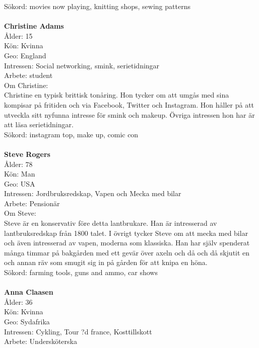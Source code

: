 \documentclass[a4paper,11pt]{article}
\begin{document}
{\begin{thebibliography}{888}
Sökord: movies now playing, knitting shops, sewing patterns \\\\

\textbf{Christine Adams} \\
Ålder: 15 \\
Kön: Kvinna \\
Geo: England \\
Intressen: Social networking, smink, serietidningar \\
Arbete: student \\
Om Christine: \\

Christine en typisk brittisk tonåring. Hon tycker om att umgås med sina kompisar på fritiden och via Facebook, Twitter och Instagram. Hon håller på att utveckla sitt nyfunna intresse för smink och makeup. Övriga intressen hon har är att läsa serietidningar.  \\

Sökord: instagram top, make up, comic con  \\\\

\textbf{Steve Rogers} \\
Ålder: 78 \\
Kön: Man \\
Geo: USA \\
Intressen: Jordbruksredskap, Vapen och Mecka med bilar\\
Arbete: Pensionär\\
Om Steve: \\

Steve är en konservativ före detta lantbrukare. Han är intresserad av lantbruksredskap från 1800 talet. I övrigt tycker Steve om att mecka med bilar och även intresserad av vapen, moderna som klassiska. Han har själv spenderat många timmar på bakgården med ett gevär över axeln och då och då skjutit en och annan räv som smugit sig in på gården för att knipa en höna. \\

Sökord: farming tools, guns and ammo, car shows \\\\

\textbf{Anna Claasen} \\
Ålder: 36 \\
Kön: Kvinna\\
Geo: Sydafrika \\
Intressen: Cykling, Tour ?d france, Kosttillskott  \\
Arbete: Undersköterska\\


\end{thebibliography}}
\end{document}
